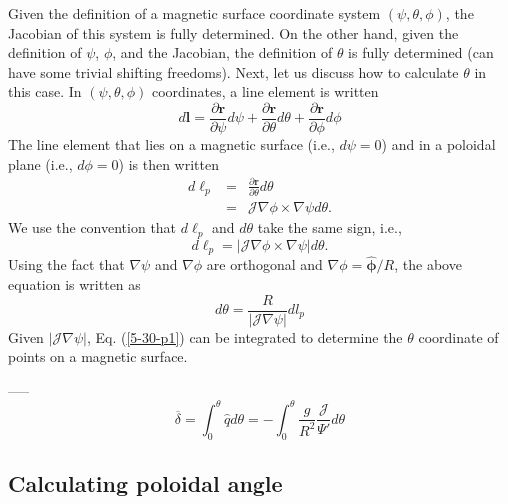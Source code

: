 \documentclass{llncs}
\newcommand{\tmmathbf}[1]{\ensuremath{\boldsymbol{#1}}}
\begin{document}
Given the definition of a magnetic surface coordinate system $(\psi, \theta,
\phi)$, the Jacobian of this system is fully determined. On the other hand,
given the definition of $\psi$, $\phi$, and the Jacobian, the definition of
$\theta$ is fully determined (can have some trivial shifting freedoms). Next,
let us discuss how to calculate $\theta$ in this case. In $(\psi, \theta,
\phi)$ coordinates, a line element is written
\begin{equation}
  \label{17-11-6-p1} d\mathbf{l}= \frac{\partial \mathbf{r}}{\partial \psi} d
  \psi + \frac{\partial \mathbf{r}}{\partial \theta} d \theta + \frac{\partial
  \mathbf{r}}{\partial \phi} d \phi
\end{equation}
The line element that lies on a magnetic surface (i.e., $d \psi = 0$) and in a
poloidal plane (i.e., $d \phi = 0$) is then written
\begin{eqnarray}
  d\tmmathbf{\ell}_p & = & \frac{\partial \mathbf{r}}{\partial \theta} d
  \theta \nonumber\\
  & = & \mathcal{J} \nabla \phi \times \nabla \psi d \theta . 
\end{eqnarray}
We use the convention that $d \ell_p$ and $d \theta$ take the same sign, i.e.,
\begin{equation}
  d \ell_p = | \mathcal{J} \nabla \phi \times \nabla \psi | d \theta .
\end{equation}
Using the fact that $\nabla \psi$ and $\nabla \phi$ are orthogonal and $\nabla
\phi = \hat{\tmmathbf{\phi}} / R$, the above equation is written as
\begin{equation}
  \label{5-30-p1} d \theta = \frac{R}{|\mathcal{J} \nabla \psi |} d l_p
\end{equation}
Given $|\mathcal{J} \nabla \psi |$, Eq. (\ref{5-30-p1}) can be integrated to
determine the $\theta$ coordinate of points on a magnetic surface.

-----
\begin{equation}
  \overline{\delta} = \int_0^{\theta} \hat{q} d \theta = - \int_0^{\theta}
  \frac{g}{R^2}  \frac{\mathcal{J}}{\Psi'} d \theta
\end{equation}

\subsection{Calculating poloidal angle}
\end{document}
